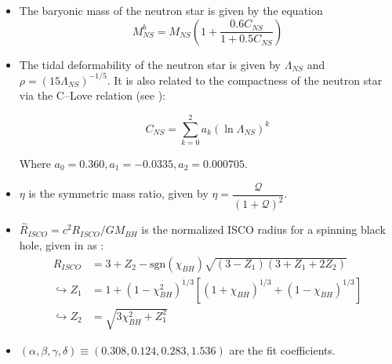     \begin{itemize}

        \item The baryonic mass of the neutron star is given by the equation $$M_{NS}^b
            = M_{NS} \left(1 + \dfrac{0.6 C_{NS}}{1 + 0.5 C_{NS}} \right)$$

        \item The tidal deformability of the neutron star is given by $\Lambda_{NS}$ and
            $\rho = (15 \Lambda_{NS})^{-1/5}$. It is also related to the compactness of
            the neutron star via the C--Love relation (see \cite{yagi_2017}):

            \begin{equation}
                \label{eq:c_love}
                C_{NS} = \sum_{k=0}^{2} a_k (\ln \Lambda_{NS})^k
            \end{equation}

            Where $a_0 = 0.360, a_1 = -0.0335, a_2 = 0.000705$.

        \item $\eta$ is the symmetric mass ratio, given by $ \eta =
            \dfrac{\mathcal{Q}}{(1 + \mathcal{Q})^2} $.

        \item $\hat{R}_{ISCO} = c^2 R_{ISCO} / GM_{BH}$ is the normalized ISCO radius
            for a spinning black hole, given in \cite{bardeen_1972} as :
            \begin{align}
                \label{eq:r_isco}
                \hat{R}_{ISCO} &=
                    3 +
                    Z_2 -
                    \mathrm{sgn}(\chi_{BH}) \sqrt{(3 - Z_1)(3+Z_1 + 2Z_2)} \\
                \hookrightarrow Z_1 &=
                                1 +
                                (1 - \chi_{BH}^2)^{1/3}
                                [
                                    (1 + \chi_{BH})^{1/3} + (1 - \chi_{BH})^{1/3}
                                ] \nonumber \\
                \hookrightarrow Z_2 &=
                                \sqrt{3\chi_{BH}^2 +  Z_1^2} \nonumber
            \end{align}

        \item $(\alpha, \beta, \gamma, \delta) \equiv (0.308, 0.124, 0.283, 1.536)$ are
            the fit coefficients.

    \end{itemize}

